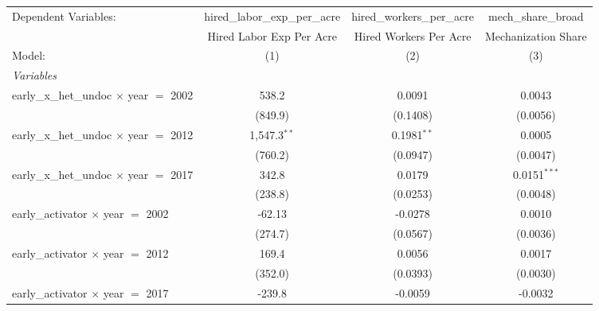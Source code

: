 
\begingroup
\centering
\begin{tabular}{lccc}
   \tabularnewline \midrule \midrule
   Dependent Variables:                            & hired\_labor\_exp\_per\_acre     & hired\_workers\_per\_acre    & mech\_share\_broad\\    
                                                   & Hired Labor Exp Per Acre         & Hired Workers Per Acre       & Mechanization Share \\   
   Model:                                          & (1)                              & (2)                          & (3)\\  
   \midrule
   \emph{Variables}\\
   early\_x\_het\_undoc $\times$ year $=$ 2002     & 538.2                            & 0.0091                       & 0.0043\\   
                                                   & (849.9)                          & (0.1408)                     & (0.0056)\\   
   early\_x\_het\_undoc $\times$ year $=$ 2012     & 1,547.3$^{**}$                   & 0.1981$^{**}$                & 0.0005\\   
                                                   & (760.2)                          & (0.0947)                     & (0.0047)\\   
   early\_x\_het\_undoc $\times$ year $=$ 2017     & 342.8                            & 0.0179                       & 0.0151$^{***}$\\   
                                                   & (238.8)                          & (0.0253)                     & (0.0048)\\   
   early\_activator $\times$ year $=$ 2002         & -62.13                           & -0.0278                      & 0.0010\\   
                                                   & (274.7)                          & (0.0567)                     & (0.0036)\\   
   early\_activator $\times$ year $=$ 2012         & 169.4                            & 0.0056                       & 0.0017\\   
                                                   & (352.0)                          & (0.0393)                     & (0.0030)\\   
   early\_activator $\times$ year $=$ 2017         & -239.8                           & -0.0059                      & -0.0032\\   

\end{tabular}
